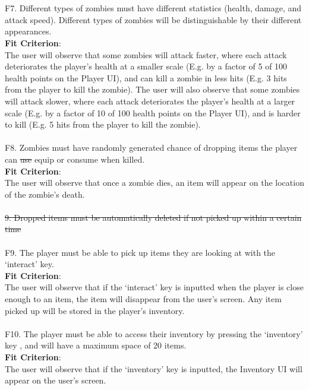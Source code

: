 \documentclass[12pt, titlepage]{article}
\begin{document}
\\\\
{\color{magenta} F7.} Different types of zombies must have different statistics (health, damage, {\color{magenta} and attack speed). Different types of zombies will be distinguishable by their different appearances. \\
\textbf{Fit Criterion}:\\ The user will observe that some zombies will attack faster, where each attack deteriorates the player's health at a smaller scale (E.g. by a factor of 5 of 100 health points on the Player UI), and can kill a zombie in less hits (E.g. 3 hits from the player to kill the zombie). The user will also observe that some zombies will attack slower, where each attack deteriorates the player's health at a larger scale (E.g. by a factor of 10 of 100 health points on the Player UI), and is harder to kill (E.g. 5 hits from the player to kill the zombie)}.
\\\\
{\color{magenta} F8.} Zombies must have randomly generated chance of dropping items the player can \sout{use} {\color{magenta} equip} or consume when killed. \\
{\color{magenta} \textbf{Fit Criterion}:\\ The user will observe that once a zombie dies, an item will appear on the location of the zombie's death.}
\\\\
\sout{9. Dropped items must be automatically deleted if not picked up within a certain time}
\\\\
{\color{magenta} F9.} The player must be able to pick up items they are looking at with the ‘interact’ key. \\
{\color{magenta} \textbf{Fit Criterion}:\\ The user will observe that if the ‘interact’ key is inputted when the player is close enough to an item, the item will disappear from the user's screen. Any item picked up will be stored in the player's inventory.}
\\\\
{\color{magenta} F10.} The player must be able to access their inventory by pressing the ‘inventory’ key{\color{magenta} , and will have a maximum space of 20 items. \\
\textbf{Fit Criterion}:\\ The user will observe that if the ‘inventory’ key is inputted, the Inventory UI will appear on the user's screen.}
\end{document}
